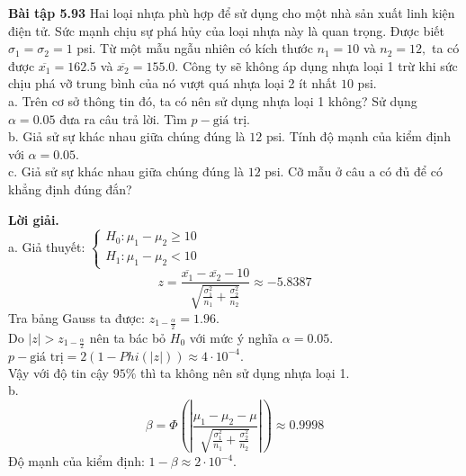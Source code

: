 \begin{mybox}
\textbf{Bài tập 5.93} Hai loại nhựa phù hợp để sử dụng cho một nhà sản xuất linh kiện điện tử. Sức mạnh chịu sự phá hủy của loại nhựa này là quan trọng. Được biết $\sigma_1 = \sigma_2 = 1$ psi. Từ một mẫu ngẫu nhiên có kích thước $n_1 = 10$ và $n_2 = 12,$ ta có được $\overline{x_1} = 162.5$ và $\overline{x_2} = 155.0.$ Công ty sẽ không áp dụng nhựa loại 1 trừ khi sức chịu phá vỡ trung bình của nó vượt quá nhựa loại 2 ít nhất $10$ psi.\\
a. Trên cơ sở thông tin đó, ta có nên sử dụng nhựa loại 1 không? Sử dụng $\alpha = 0.05$ đưa ra câu trả lời. Tìm $p-\text{giá trị}.$\\
b. Giả sử sự khác nhau giữa chúng đúng là $12$ psi. Tính độ mạnh của kiểm định với $\alpha = 0.05.$\\
c. Giả sử sự khác nhau giữa chúng đúng là $12$ psi. Cỡ mẫu ở câu a có đủ để có khẳng định đúng đắn?
\end{mybox}
\textbf{Lời giải.}\\
a. Giả thuyết: $\begin{cases}
H_0: \mu_1 - \mu_2 \geqslant 10\\
H_1: \mu_1 - \mu_2 < 10
\end{cases}$\\
$$z = \frac{{\overline {{x_1}}  - \overline {{x_2}} } - 10}{{\sqrt {\frac{{\sigma _1^2}}{{{n_1}}} + \frac{{\sigma _2^2}}{{{n_2}}}} }} \approx -5.8387$$
Tra bảng Gauss ta được: $z_{1 - \frac{\alpha}{2}} = 1.96.$\\
Do $\left| z \right| > z_{1 - \frac{\alpha}{2}}$ nên ta bác bỏ $H_0$ với mức ý nghĩa $\alpha = 0.05.$\\
$p-\text{giá trị} = 2 \left( {1 - Phi \left( {\left| z \right|} \right)} \right) \approx 4 \cdot 10^{-4}.$\\
Vậy với độ tin cậy $95\%$ thì ta không nên sử dụng nhựa loại 1.\\
b. $$\beta  = \Phi \left( {\left| {\frac{{{\mu _1} - {\mu _2} - \mu }}{{\sqrt {\frac{{\sigma _1^2}}{{{n_1}}} + \frac{{\sigma _2^2}}{{{n_2}}}} }}} \right|} \right) \approx 0.9998 $$
Độ mạnh của kiểm định: $1 - \beta \approx 2 \cdot 10^{-4}.$\\

